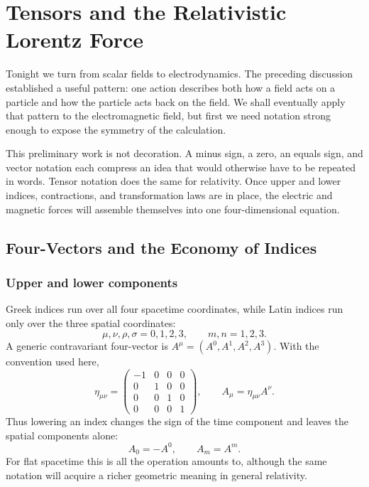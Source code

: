 \chapter{Tensors and the Relativistic Lorentz Force}

Tonight we turn from scalar fields to electrodynamics.  The preceding
discussion established a useful pattern: one action describes both how a
field acts on a particle and how the particle acts back on the field.  We
shall eventually apply that pattern to the electromagnetic field, but first
we need notation strong enough to expose the symmetry of the calculation.

This preliminary work is not decoration.  A minus sign, a zero, an equals
sign, and vector notation each compress an idea that would otherwise have to
be repeated in words.  Tensor notation does the same for relativity.  Once
upper and lower indices, contractions, and transformation laws are in place,
the electric and magnetic forces will assemble themselves into one
four-dimensional equation.

\section{Four-Vectors and the Economy of Indices}

\subsection{Upper and lower components}

Greek indices run over all four spacetime coordinates, while Latin indices
run only over the three spatial coordinates:
\begin{equation}
\mu,\nu,\rho,\sigma=0,1,2,3,
\qquad
m,n=1,2,3.
\end{equation}
A generic contravariant four-vector is \(A^\mu=(A^0,A^1,A^2,A^3)\).
With the convention used here,
\begin{equation}
\eta_{\mu\nu}
=
\begin{pmatrix}
-1&0&0&0\\
0&1&0&0\\
0&0&1&0\\
0&0&0&1
\end{pmatrix},
\qquad
A_\mu=\eta_{\mu\nu}A^\nu .
\label{eq:sr6-metric-lowering}
\end{equation}
Thus lowering an index changes the sign of the time component and leaves the
spatial components alone:
\begin{equation}
A_0=-A^0,
\qquad
A_m=A^m.
\label{eq:sr6-component-lowering}
\end{equation}
For flat spacetime this is all the operation amounts to, although the same
notation will acquire a richer geometric meaning in general relativity.

